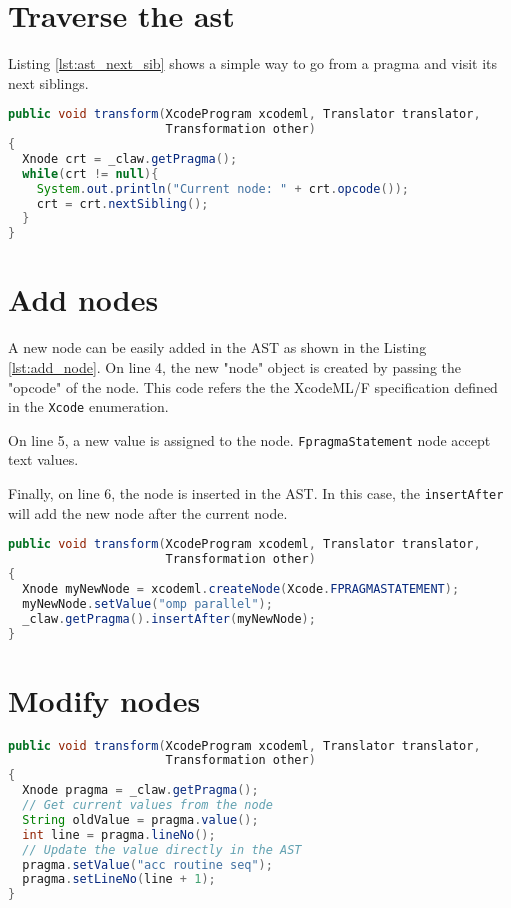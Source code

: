 \section{Traverse the \gls{ast}}
Listing \ref{lst:ast_next_sib} shows a simple way to go from a pragma and visit
its next siblings.

\begin{lstlisting}[label=lst:ast_next_sib, language=Java,
  caption=XcodeML AST traverse]
public void transform(XcodeProgram xcodeml, Translator translator,
                      Transformation other)
{
  Xnode crt = _claw.getPragma();
  while(crt != null){
    System.out.println("Current node: " + crt.opcode());
    crt = crt.nextSibling();
  }
}
\end{lstlisting}

\section{Add nodes}
A new node can be easily added in the AST as shown in the Listing
\ref{lst:add_node}. On line 4, the new "node" object is created by
passing the "opcode" of the node. This code refers the the XcodeML/F
specification defined in the \lstinline!Xcode! enumeration.

On line 5, a new value is assigned to the node. \lstinline!FpragmaStatement!
node accept text values.

Finally, on line 6, the node is inserted in the AST. In this case,
the \lstinline!insertAfter! will add the new node after the current node.

\begin{lstlisting}[label=lst:add_node, language=Java,
  caption=XcodeML add node example]
public void transform(XcodeProgram xcodeml, Translator translator,
                      Transformation other)
{
  Xnode myNewNode = xcodeml.createNode(Xcode.FPRAGMASTATEMENT);
  myNewNode.setValue("omp parallel");
  _claw.getPragma().insertAfter(myNewNode);
}
\end{lstlisting}

\section{Modify nodes}

\begin{lstlisting}[label=lst:update_node, language=Java,
  caption=XcodeML update node example]
public void transform(XcodeProgram xcodeml, Translator translator,
                      Transformation other)
{
  Xnode pragma = _claw.getPragma();
  // Get current values from the node
  String oldValue = pragma.value();
  int line = pragma.lineNo();
  // Update the value directly in the AST
  pragma.setValue("acc routine seq");
  pragma.setLineNo(line + 1);
}
\end{lstlisting}

